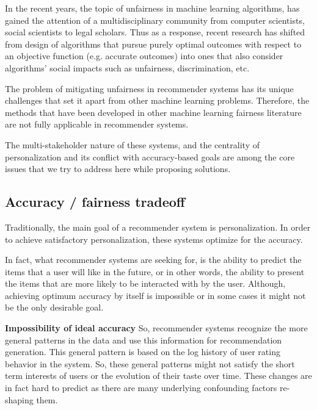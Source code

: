 In the recent years, the topic of unfairness in machine learning algorithms, has gained the attention of a multidisciplinary community from computer scientists, social scientists to legal scholars. Thus as a response, recent research has shifted from design of algorithms that pursue purely optimal outcomes with respect to an objective function (e.g. accurate outcomes) into ones that also consider algorithms' social impacts such as unfairness, discrimination, etc.

The problem of mitigating unfairness in recommender systems has its unique challenges that set it apart from other machine learning problems. Therefore, the methods that have been developed in other machine learning fairness literature are not fully applicable in recommender systems.

The multi-stakeholder nature of these systems, and the centrality of personalization and its conflict with accuracy-based goals are among the core issues that we try to address here while proposing solutions.

\subsection{Accuracy / fairness tradeoff}

Traditionally, the main goal of a recommender system is personalization. In order to achieve satisfactory personalization, these systems optimize for the accuracy.

In fact, what recommender systems are seeking for, is the ability to predict the items that a user will like in the future, or in other words, the ability to present the items that are more likely to be interacted with by the user. Although, achieving optimum accuracy by itself is impossible or in some cases it might not be the only desirable goal.

\textbf{Impossibility of ideal accuracy}
So, recommender systems recognize the more general patterns in the data and use this information for recommendation generation. This general pattern is based on the log history of user rating behavior in the system. So, these general patterns might not satisfy the short term interests of users or the evolution of their taste over time. These changes are in fact hard to predict as there are many underlying confounding factors re-shaping them.

